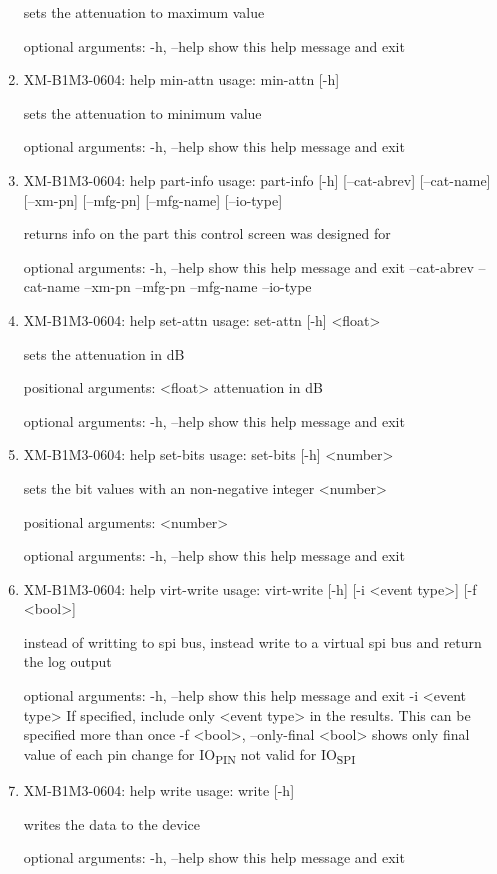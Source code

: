 \documentclass[11pt]{article}
\begin{document}
\begin{enumerate}
sets the attenuation to maximum value

optional arguments:
  -h, --help  show this help message and exit

\item XM-B1M3-0604: help min-attn
\label{sec:org67d4158}
usage: min-attn [-h]

sets the attenuation to minimum value

optional arguments:
  -h, --help  show this help message and exit

\item XM-B1M3-0604: help part-info
\label{sec:orgf5164e4}
usage: part-info  [-h] [--cat-abrev] [--cat-name] [--xm-pn] [--mfg-pn] [--mfg-name]
        [--io-type]

returns info on the part this control screen was designed for

optional arguments:
  -h, --help   show this help message and exit
  --cat-abrev
  --cat-name
  --xm-pn
  --mfg-pn
  --mfg-name
  --io-type

\item XM-B1M3-0604: help set-attn
\label{sec:org3cf639a}
usage: set-attn [-h] <float>

sets the attenuation in dB

positional arguments:
  <float>     attenuation in dB

optional arguments:
  -h, --help  show this help message and exit

\item XM-B1M3-0604: help set-bits
\label{sec:orgf4d3350}
usage: set-bits [-h] <number>

sets the bit values with an non-negative integer <number>

positional arguments:
  <number>

optional arguments:
  -h, --help  show this help message and exit

\item XM-B1M3-0604: help virt-write
\label{sec:org26320b7}
usage: virt-write [-h] [-i <event type>] [-f <bool>]

instead of writting to spi bus, instead write to a virtual spi bus and return
the log output

optional arguments:
  -h, --help            show this help message and exit
  -i <event type>       If specified, include only <event type> in the
                        results. This can be specified more than once
  -f <bool>, --only-final <bool>
                        shows only final value of each pin change for IO\textsubscript{PIN}
                        not valid for IO\textsubscript{SPI}

\item XM-B1M3-0604: help write
\label{sec:orgc710797}
usage: write [-h]

writes the data to the device

optional arguments:
  -h, --help  show this help message and exit
\end{enumerate}
\end{document}
